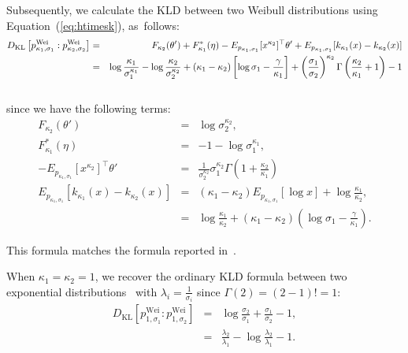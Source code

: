 \documentclass[entropy,article,accept,oneauthor,pdftex,entropy]{Definitions/mdpi}
\def\Wei{\mathrm{Wei}}
\def\KL{\mathrm{KL}}
\begin{document}
\begin{paracol}{2}
\begin{Example}
Subsequently, we calculate the KLD between two Weibull distributions using Equation~(\ref{eq:htimesk}), as~follows:
\begingroup\makeatletter\def\f@size{8}\check@mathfonts
\def\maketag@@@#1{\hbox{\m@th\normalsize\normalfont#1}}%
\begin{eqnarray}
D_\KL\left[p^\Wei_{\kappa_1,\sigma_1}:p^\Wei_{\kappa_2,\sigma_2}\right] &=& 
F_{\kappa_2}(\theta') + F^*_{\kappa_1}(\eta)- E_{p_{\kappa_1,\sigma_1}}[x^{\kappa_2}]^\top \theta' +E_{p_{\kappa_1,\sigma_1}}[k_{\kappa_1}(x)-k_{\kappa_2}(x)]
\\
&=& \log \frac{\kappa_{1}}{\sigma_{1}^{\kappa_{1}}}-\log \frac{\kappa_{2}}{\sigma_{2}^{\kappa_{2}}}+
\left(\kappa_{1}-\kappa_{2}\right)\left[\log \sigma_{1}-\frac{\gamma}{\kappa_{1}}\right]+\left(\frac{\sigma_{1}}{\sigma_{2}}\right)^{\kappa_{2}} \Gamma\left(\frac{\kappa_{2}}{\kappa_{1}}+1\right)-1\\ \nonumber\vspace{-6pt}
\end{eqnarray}
\endgroup
since we have the following terms:
\begin{eqnarray*}
F_{\kappa_2}(\theta') &=&  \log \sigma_2^{\kappa_2},\\
F^*_{\kappa_1}(\eta) &=&  -1-\log \sigma_1^{\kappa_1},\\
- E_{p_{\kappa_1,\sigma_1}}[x^{\kappa_2}]^\top \theta' &=& \frac{1}{\sigma_2^{\kappa_2}} \sigma_1^{\kappa_2}\Gamma\left(1+\frac{\kappa_2}{\kappa_1}\right)\\
E_{p_{\kappa_1,\sigma_1}}[k_{\kappa_1}(x)-k_{\kappa_2}(x)] &=& (\kappa_1-\kappa_2)E_{p_{\kappa_1,\sigma_1}}[\log x]+\log\frac{\kappa_1}{\kappa_2},\\
&=& \log\frac{\kappa_1}{\kappa_2} +  (\kappa_1-\kappa_2)\left(\log\sigma_1-\frac{\gamma}{\kappa_1}\right).
\end{eqnarray*}

This formula matches the formula reported in~\cite{KLDWeibull-2013}.

When $\kappa_1=\kappa_2=1$, we recover the ordinary KLD formula between two exponential distributions~\cite{EF-2009} with $\lambda_i=\frac{1}{\sigma_i}$ since $\Gamma(2)=(2-1)!=1$:
\begin{eqnarray}
D_\KL\left[p^\Wei_{1,\sigma_1}:p^\Wei_{1,\sigma_2}\right] &=&  \log\frac{\sigma_2}{\sigma_1}+ \frac{\sigma_1}{\sigma_2}-1,\\
&=& \frac{\lambda_2}{\lambda_1}-\log\frac{\lambda_2}{\lambda_1}-1.\label{eq:klexp}
\end{eqnarray}


\end{Example}
\end{paracol}
\end{document}
